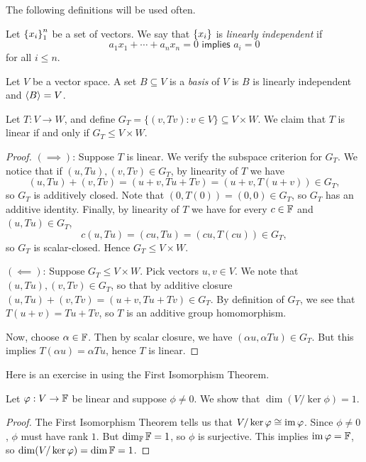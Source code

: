 \documentclass{article}
\begin{document}
The following definitions will be used often.
\begin{definition}
Let $\left\{x_i\right\}_1^n$ be a set of vectors. We say that $\left\{x_i\right\}$ is \textit{linearly independent} if
$$a_1x_1 + \cdots + a_nx_n = 0 \textsf{ implies } a_i = 0$$
for all $i\leq n$.
\end{definition}
\begin{definition}
Let $V$ be a vector space. A set $B\subseteq V$ is a \textit{basis} of $V$ is $B$ is linearly independent and $\left\langle B\right\rangle = V$.
\end{definition}
\begin{example}
Let $T: V\to W$, and define $G_T = \{(v, Tv): v\in V\}\subseteq V\times W$. We claim that $T$ is linear if and only if $G_T\leq V\times W$.
\end{example}
\begin{proof}
$(\implies)$: Suppose $T$ is linear. We verify the subspace criterion for $G_T$. We notice that if $(u, Tu), (v, Tv)\in G_T$, by linearity of $T$ we have
$$(u, Tu) + (v, Tv) = (u+v, Tu+Tv) = (u+v, T(u+v)) \in G_T,$$
so $G_T$ is additively closed. Note that $(0, T(0)) = (0,0)\in G_T$, so $G_T$ has an additive identity. Finally, by linearity of $T$ we have for every $c\in\mathbb F$ and $(u, Tu)\in G_T$, $$c(u, Tu) = (cu, Tu) = (cu, T(cu)) \in G_T,$$
so $G_T$ is scalar-closed. Hence $G_T\leq V\times W$.

$(\impliedby)$: Suppose $G_T\leq V\times W$. Pick vectors $u, v\in V$. We note that $(u, Tu), (v, Tv)\in G_T$, so that by additive closure $(u, Tu) + (v, Tv) = (u+v, Tu+Tv)\in G_T$. By definition of $G_T$, we see that $T(u+v) = Tu+Tv$, so $T$ is an additive group homomorphism.

Now, choose $\alpha\in \mathbb F$. Then by scalar closure, we have $(\alpha u, \alpha Tu)\in G_T$. But this implies $T(\alpha u) = \alpha Tu$, hence $T$ is linear.
\end{proof}

Here is an exercise in using the First Isomorphism Theorem.
\begin{example}
Let $\varphi: V\to\mathbb F$ be linear and suppose $\phi\neq 0$. We show that $\dim(V/\ker \phi) = 1$.
\end{example}
\begin{proof}
The First Isomorphism Theorem tells us that $V/\ker \varphi \cong \operatorname{im} \varphi$. Since $\phi\neq 0$, $\phi$ must have rank $1$. But $\dim_\mathbb F \mathbb F = 1$, so $\phi$ is surjective. This implies $\operatorname{im}\varphi = \mathbb F$, so $\dim(V/\ker \varphi) = \dim \mathbb F = 1$.
\end{proof}
\end{document}
